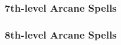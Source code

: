 \subsubsection{7th-level Arcane Spells}
\begin{swspelllist}

    \SLenergyconversion[Abjur]
    \SLspellturning
    \SLantimagicfield*

    \SLacidfog[Conj]
    \SLcloudkill
    \SLsummonmonstervii
    \SLdimensiondoormass*

    \SLmomentofprescience[Div]
    \SLreadmindgreater
    \SLprecognitiongreater*

    \SLconfusionmass[Ench]
    \SLdeepslumber
    \SLfeeblemind
    \SLheroismgreater
    \SLdominateperson*

    \SLenergyconversion[Evoc]
    \SLmissilestorm
    \SLshoutgreater
    \SLforcecage*

    \SLinvisibilitymass[Illus]
    \SLprojectimage
    \SLshadowbody

    \SLfingerofdeath[Necro]
    \SLinflictseriouswounds
    \SLpowerwordblind
    \SLstriptheflesh
    \SLlifebreakercurse*

    \SLblacktentacles[Trans]
    \SLcombattransformation
    \SLshadowbody

    \SLprismaticspray[Univ]
\end{swspelllist}

\subsubsection{8th-level Arcane Spells} 
\begin{swspelllist}

    \SLshadowumbra[Abjur]
    \SLspelltheftgreater*

    \SLseaoffog[Conj]
    \SLsummonmonsterviii
    \SLmaze*

    \SLprecognitiongreater[Div]
    \SLreadmindmass
    \SLrevelation*

    \SLholdpersonmass[Ench]
    \SLscintillatingpattern
    \SLpowerwordstun
    \SLsuggestionmass*

    \SLconeofcoldgreater[Evoc]
    \SLpolarray
    \SLcrushinghand*

    \SLscintillatingpattern[Illus]
    \SLshadowumbra

    \SLenervationgreater[Necro]
    \SLinflictcriticalwounds
    \SLwavesofexhaustion
    \SLhorridwilting*

    \SLironbody[Trans]
    \SLreversegravity
    \SLtemporalstasis
    \SLhastemass*
\end{swspelllist}

